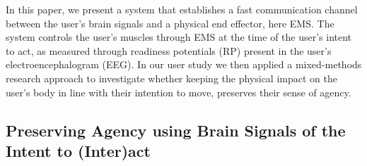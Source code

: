 In this paper, we present a system that establishes a fast communication channel between the user's brain signals and a physical end effector, here EMS. The system controls the user's muscles through EMS at the time of the user's intent to act, as measured through readiness potentials (RP) present in the user's electroencephalogram (EEG). In our user study we then applied a mixed-methods research approach to investigate whether keeping the physical impact on the user's body in line with their intention to move, preserves their sense of agency.

\subsection{Preserving Agency using Brain Signals of the Intent to (Inter)act}

